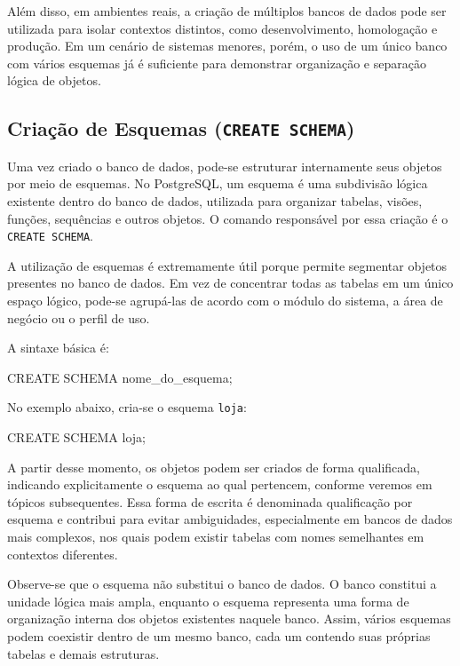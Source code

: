 Além disso, em ambientes reais, a criação de múltiplos bancos de dados pode ser utilizada para isolar contextos distintos, como desenvolvimento, homologação e produção. Em um cenário de sistemas menores, porém, o uso de um único banco com vários esquemas já é suficiente para demonstrar organização e separação lógica de objetos.

\subsection{Criação de Esquemas (\texttt{CREATE SCHEMA})}

Uma vez criado o banco de dados, pode-se estruturar internamente seus objetos por meio de esquemas. No PostgreSQL, um esquema é uma subdivisão lógica existente dentro do banco de dados, utilizada para organizar tabelas, visões, funções, sequências e outros objetos. O comando responsável por essa criação é o \texttt{CREATE SCHEMA}.

A utilização de esquemas é extremamente útil porque permite segmentar objetos presentes no banco de dados. Em vez de concentrar todas as tabelas em um único espaço lógico, pode-se agrupá-las de acordo com o módulo do sistema, a área de negócio ou o perfil de uso.

A sintaxe básica é:

\begin{sqlcode}
CREATE SCHEMA nome_do_esquema;
\end{sqlcode}

No exemplo abaixo, cria-se o esquema \texttt{loja}:

\begin{sqlcode}
CREATE SCHEMA loja;
\end{sqlcode}

A partir desse momento, os objetos podem ser criados de forma qualificada, indicando explicitamente o esquema ao qual pertencem, conforme veremos em tópicos subsequentes. Essa forma de escrita é denominada qualificação por esquema e contribui para evitar ambiguidades, especialmente em bancos de dados mais complexos, nos quais podem existir tabelas com nomes semelhantes em contextos diferentes.

Observe-se que o esquema não substitui o banco de dados. O banco constitui a unidade lógica mais ampla, enquanto o esquema representa uma forma de organização interna dos objetos existentes naquele banco. Assim, vários esquemas podem coexistir dentro de um mesmo banco, cada um contendo suas próprias tabelas e demais estruturas.

